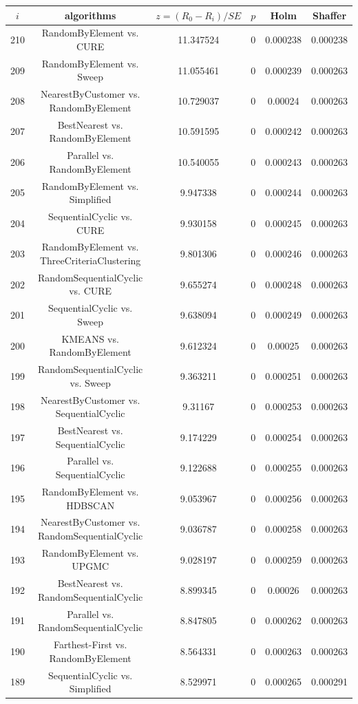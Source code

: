 \documentclass[a4paper,10pt]{article}
\begin{document}
\begin{landscape}
\begin{table}[!htp]
\centering\scriptsize
\begin{tabular}{cccccc}
$i$&algorithms&$z=(R_0 - R_i)/SE$&$p$&Holm&Shaffer\\
\hline210&RandomByElement vs. CURE&11.347524&0&0.000238&0.000238\\
209&RandomByElement vs. Sweep&11.055461&0&0.000239&0.000263\\
208&NearestByCustomer vs. RandomByElement&10.729037&0&0.00024&0.000263\\
207&BestNearest vs. RandomByElement&10.591595&0&0.000242&0.000263\\
206&Parallel vs. RandomByElement&10.540055&0&0.000243&0.000263\\
205&RandomByElement vs. Simplified&9.947338&0&0.000244&0.000263\\
204&SequentialCyclic vs. CURE&9.930158&0&0.000245&0.000263\\
203&RandomByElement vs. ThreeCriteriaClustering&9.801306&0&0.000246&0.000263\\
202&RandomSequentialCyclic vs. CURE&9.655274&0&0.000248&0.000263\\
201&SequentialCyclic vs. Sweep&9.638094&0&0.000249&0.000263\\
200&KMEANS vs. RandomByElement&9.612324&0&0.00025&0.000263\\
199&RandomSequentialCyclic vs. Sweep&9.363211&0&0.000251&0.000263\\
198&NearestByCustomer vs. SequentialCyclic&9.31167&0&0.000253&0.000263\\
197&BestNearest vs. SequentialCyclic&9.174229&0&0.000254&0.000263\\
196&Parallel vs. SequentialCyclic&9.122688&0&0.000255&0.000263\\
195&RandomByElement vs. HDBSCAN&9.053967&0&0.000256&0.000263\\
194&NearestByCustomer vs. RandomSequentialCyclic&9.036787&0&0.000258&0.000263\\
193&RandomByElement vs. UPGMC&9.028197&0&0.000259&0.000263\\
192&BestNearest vs. RandomSequentialCyclic&8.899345&0&0.00026&0.000263\\
191&Parallel vs. RandomSequentialCyclic&8.847805&0&0.000262&0.000263\\
190&Farthest-First vs. RandomByElement&8.564331&0&0.000263&0.000263\\
189&SequentialCyclic vs. Simplified&8.529971&0&0.000265&0.000291\\

\end{tabular}
\end{table}
\end{landscape}
\end{document}
